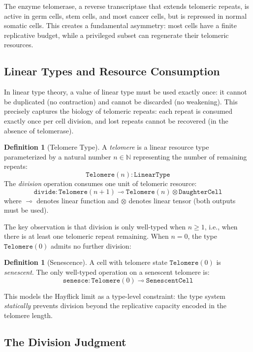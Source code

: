 \documentclass[12pt,a4paper]{article}
\theoremstyle{plain}
\theoremstyle{definition}
\newtheorem{definition}[theorem]{Definition}
\begin{document}
The enzyme telomerase, a reverse transcriptase that extends telomeric repeats, is active in germ cells, stem cells, and most cancer cells, but is repressed in normal somatic cells. This creates a fundamental asymmetry: most cells have a finite replicative budget, while a privileged subset can regenerate their telomeric resources.

\subsection{Linear Types and Resource Consumption}

In linear type theory, a value of linear type must be used exactly once: it cannot be duplicated (no contraction) and cannot be discarded (no weakening). This precisely captures the biology of telomeric repeats: each repeat is consumed exactly once per cell division, and lost repeats cannot be recovered (in the absence of telomerase).

\begin{definition}[Telomere Type]\label{def:telomere-type}
A \emph{telomere} is a linear resource type parameterized by a natural number $n \in \mathbb{N}$ representing the number of remaining repeats:
\[
  \texttt{Telomere}(n) : \texttt{LinearType}
\]
The \emph{division} operation consumes one unit of telomeric resource:
\[
  \texttt{divide} : \texttt{Telomere}(n+1) \multimap \texttt{Telomere}(n) \otimes \texttt{DaughterCell}
\]
where $\multimap$ denotes linear function and $\otimes$ denotes linear tensor (both outputs must be used).
\end{definition}

The key observation is that division is only well-typed when $n \geq 1$, i.e., when there is at least one telomeric repeat remaining. When $n = 0$, the type $\texttt{Telomere}(0)$ admits no further division:

\begin{definition}[Senescence]\label{def:senescence}
A cell with telomere state $\texttt{Telomere}(0)$ is \emph{senescent}. The only well-typed operation on a senescent telomere is:
\[
  \texttt{senesce} : \texttt{Telomere}(0) \multimap \texttt{SenescentCell}
\]
\end{definition}

This models the Hayflick limit as a type-level constraint: the type system \emph{statically} prevents division beyond the replicative capacity encoded in the telomere length.

\subsection{The Division Judgment}
\end{document}

